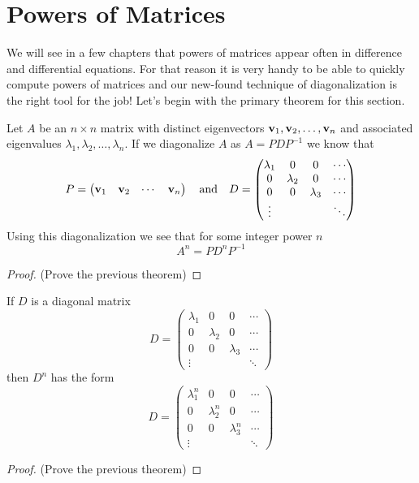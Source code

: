 \section{Powers of Matrices}
We will see in a few chapters that powers of matrices appear often in difference and
differential equations.  For that reason it is very handy to be able to quickly compute
powers of matrices and our new-found technique of diagonalization is the right tool for
the job! Let's begin with the primary theorem for this section.
\begin{thm}
    Let $A$ be an $n\times n$ matrix with distinct eigenvectors ${\bf v}_1, {\bf v}_2, \dots,
    {\bf v}_n$ and associated eigenvalues $\lambda_1, \lambda_2, \dots, \lambda_n$.  If we
    diagonalize $A$ as $A = PDP^{-1}$ we know that 
    \[ P = \begin{pmatrix} {\bf v}_1 & {\bf v}_2 & \cdots & {\bf v}_n \end{pmatrix} \quad \text{and}
        \quad D = \begin{pmatrix} \lambda_1 & 0 & 0 & \cdots \\
            0 & \lambda_2 & 0 & \cdots \\
        0 & 0 & \lambda_3 &  \cdots \\
    \vdots & && \ddots \end{pmatrix} \]
    Using this diagonalization we see that for some integer power $n$
    \[ A^n = P D^n P^{-1} \]
\end{thm}
\begin{proof}
    (Prove the previous theorem)
\end{proof}
\solution{
    \[ A^n = (PDP^{-1})^n = (PDP^{-1})(PDP^{-1})\cdots(PDP^{-1}) =
    PD(PP^{-1})D(PP^{-1})\cdots DP^{-1} = PD^nP^{-1}\]
}

\begin{thm}
    If $D$ is a diagonal matrix
    \[ D = \begin{pmatrix} \lambda_1 & 0 & 0 & \cdots \\
            0 & \lambda_2 & 0 & \cdots \\
        0 & 0 & \lambda_3 &  \cdots \\
    \vdots & && \ddots \end{pmatrix} \]
    then $D^n$ has the form
    \[ D = \begin{pmatrix} \lambda_1^n & 0 & 0 & \cdots \\
            0 & \lambda_2^n & 0 & \cdots \\
        0 & 0 & \lambda_3^n &  \cdots \\
    \vdots & && \ddots \end{pmatrix} \]
\end{thm}
\begin{proof}
    (Prove the previous theorem)
\end{proof}


